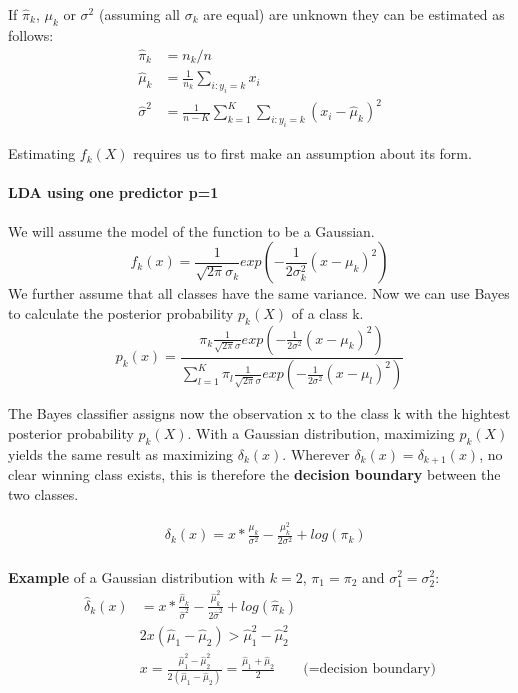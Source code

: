 \documentclass[../document.tex]{subfiles}
\begin{document}
	If $\hat{\pi}_k$, $\mu_k$ or $\sigma^2$ (assuming all $\sigma_k$ are equal) are unknown they can be estimated as follows:
	\begin{equation}
	\begin{split}
		\hat{\pi}_{k}&=n_{k}/n\\
		\hat{\mu}_{k}&=\frac{1}{n_{k}}\sum_{i:y_{i}=k}x_{i}\\
		\hat{\sigma}^2&=\frac{1}{n-K}\sum_{k=1}^{K}\sum_{i:y_{i}=k}(x_{i}-\hat{\mu}_{k})^2
	\end{split}
	\end{equation}

	Estimating \(f_{k}(X)\) requires us to first make an assumption about its form.

	\paragraph{LDA using one predictor p=1}
	We will assume the model of the function to be a Gaussian.
	\begin{equation}
		f_{k}(x)=\frac{1}{\sqrt{2\pi}\sigma_{k}}exp(-\frac{1}{2\sigma_{k}^2}(x-\mu_{k})^2)
	\end{equation}
	We further assume that all classes have the same variance. Now we can use Bayes to calculate the posterior probability $p_{k}(X)$ of a class k.
	\begin{equation}
	p_{k}(x)=\frac{\pi_{k}\frac{1}{\sqrt{2\pi}\sigma}exp(-\frac{1}{2\sigma^2}(x-\mu_{k})^2)}{\sum_{l=1}^{K}\pi_{l}\frac{1}{\sqrt{2\pi}\sigma}exp(-\frac{1}{2\sigma^2}(x-\mu_{l})^2)}
	\end{equation}

	The Bayes classifier assigns now the observation x to the class k with the hightest posterior probability $p_{k}(X)$. With a Gaussian distribution, maximizing $p_{k}(X)$ yields the same result as maximizing $\delta_{k}(x)$. Wherever $\delta_{k}(x)=\delta_{k+1}(x)$, no clear winning class exists, this is therefore the \textbf{decision boundary} between the two classes.

	\begin{equation}
		\begin{split}
			&\delta_{k}(x)=x*\frac{\mu_{k}}{\sigma^2}-\frac{\mu_{k}^2}{2\sigma^2}+log(\pi_{k})\\
		\end{split}
	\end{equation}

	\textbf{Example} of a Gaussian distribution with $k=2$, $\pi_1=\pi_2$ and $\sigma^2_1=\sigma^2_2$:
	\begin{equation}
	\begin{split}
		\hat{\delta}_{k}(x)&=x*\frac{\hat{\mu}_{k}}{\hat{\sigma}^2}-\frac{\hat{\mu}_{k}^2}{2\hat{\sigma}^2}+log(\hat{\pi}_{k})\\
		&2x(\hat{\mu}_{1}-\hat{\mu}_{2})>\hat{\mu}_{1}^2-\hat{\mu}_{2}^2\\
		&x=\frac{\hat{\mu}_{1}^2-\hat{\mu}_{2}^2}{2(\hat{\mu}_{1}-\hat{\mu}_{2})}=\frac{\hat{\mu}_{1}+\hat{\mu}_{2}}{2} \qquad \text{(=decision boundary)}
	\end{split}
	\end{equation}
\end{document}
